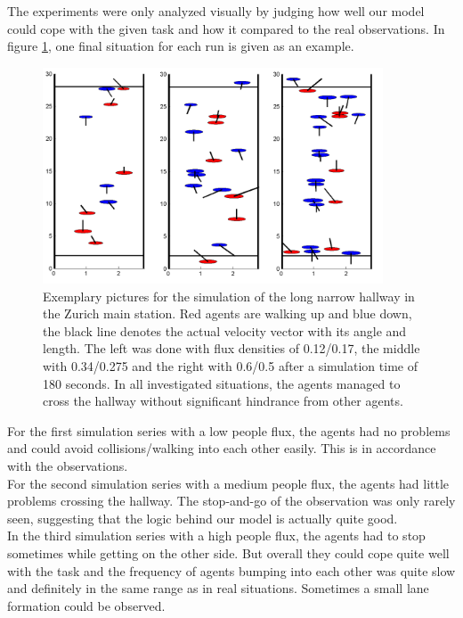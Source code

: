 
\noi The experiments were only analyzed visually by judging how well our model could cope with the given task and how it compared to the real observations. In figure \ref{fig:ex5picture}, one final situation for each run is given as an example.\\

\begin{figure}[h!]
	\centering
		\includegraphics[width=0.90\textwidth]{pictures/ex5picture.png}
	\caption{Exemplary pictures for the simulation of the long narrow hallway in the Zurich main station. Red agents are walking up and blue down, the black line denotes the actual velocity vector with its angle and length. The left was done with flux densities of 0.12/0.17, the middle with 0.34/0.275 and the right with 0.6/0.5 after a simulation time of 180 seconds. In all investigated situations, the agents managed to cross the hallway without significant hindrance from other agents.}
	\label{fig:ex5picture}
\end{figure}

\noi For the first simulation series with a low people flux, the agents had no problems and could avoid collisions/walking into each other easily. This is in accordance with the observations.\\

\noi For the second simulation series with a medium people flux, the agents had little problems crossing the hallway. The stop-and-go of the observation was only rarely seen, suggesting that the logic behind our model is actually quite good.\\

\noi In the third simulation series with a high people flux, the agents had to stop sometimes while getting on the other side. But overall they could cope quite well with the task and the frequency of agents bumping into each other was quite slow and definitely in the same range as in real situations. Sometimes a small lane formation could be observed.

